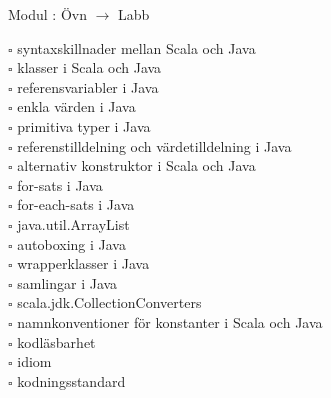 
    Modul : Övn  $\rightarrow$ Labb 
    \begin{multicols}{3}\SlideFontTiny
    $\square$ syntaxskillnader mellan Scala och Java \\
$\square$ klasser i Scala och Java \\
$\square$ referensvariabler i Java \\
$\square$ enkla värden i Java \\
$\square$ primitiva typer i Java \\
$\square$ referenstilldelning och värdetilldelning i Java \\
$\square$ alternativ konstruktor i Scala och Java \\
$\square$ for-sats i Java \\
$\square$ for-each-sats i Java \\
$\square$ java.util.ArrayList \\
$\square$ autoboxing i Java \\
$\square$ wrapperklasser i Java \\
$\square$ samlingar i Java \\
$\square$ scala.jdk.CollectionConverters \\
$\square$ namnkonventioner för konstanter i Scala och Java \\
$\square$ kodläsbarhet \\
$\square$ idiom \\
$\square$ kodningsstandard \\
    \end{multicols}
    